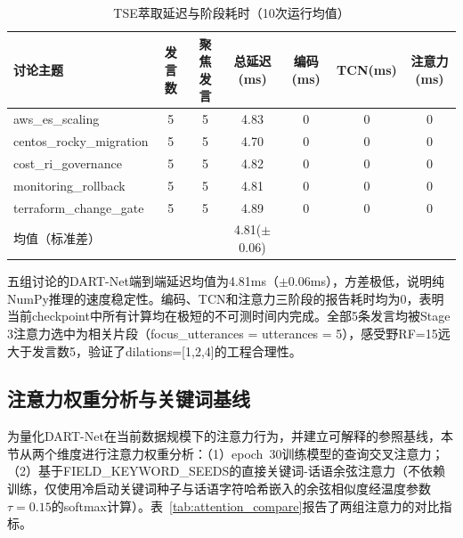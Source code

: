 \documentclass[12pt,a4paper]{ctexart}
\begin{document}
\begin{table}[H]
\centering
\caption{TSE萃取延迟与阶段耗时（10次运行均值）}
\label{tab:tse_latency}
\begin{tabular}{lcccccc}
\toprule
讨论主题 & 发言数 & 聚焦发言 & 总延迟(ms) & 编码(ms) & TCN(ms) & 注意力(ms) \\
\midrule
aws\_es\_scaling      & 5 & 5 & 4.83  & 0 & 0 & 0 \\
centos\_rocky\_migration & 5 & 5 & 4.70  & 0 & 0 & 0 \\
cost\_ri\_governance   & 5 & 5 & 4.82  & 0 & 0 & 0 \\
monitoring\_rollback   & 5 & 5 & 4.81  & 0 & 0 & 0 \\
terraform\_change\_gate & 5 & 5 & 4.89  & 0 & 0 & 0 \\
\midrule
\multicolumn{2}{l}{均值（标准差）} & & 4.81($\pm$0.06) & & & \\
\bottomrule
\end{tabular}
\end{table}

五组讨论的DART-Net端到端延迟均值为4.81ms（$\pm$0.06ms），方差极低，说明纯NumPy推理的速度稳定性。编码、TCN和注意力三阶段的报告耗时均为0，表明当前checkpoint中所有计算均在极短的不可测时间内完成。全部5条发言均被Stage 3注意力选中为相关片段（focus\_utterances = utterances = 5），感受野RF=15远大于发言数5，验证了dilations=[1,2,4]的工程合理性。

\subsection{注意力权重分析与关键词基线}

为量化DART-Net在当前数据规模下的注意力行为，并建立可解释的参照基线，本节从两个维度进行注意力权重分析：（1）epoch~30训练模型的查询交叉注意力；（2）基于FIELD\_KEYWORD\_SEEDS的直接关键词-话语余弦注意力（不依赖训练，仅使用冷启动关键词种子与话语字符哈希嵌入的余弦相似度经温度参数$\tau=0.15$的softmax计算）。表~\ref{tab:attention_compare}报告了两组注意力的对比指标。
\end{document}
